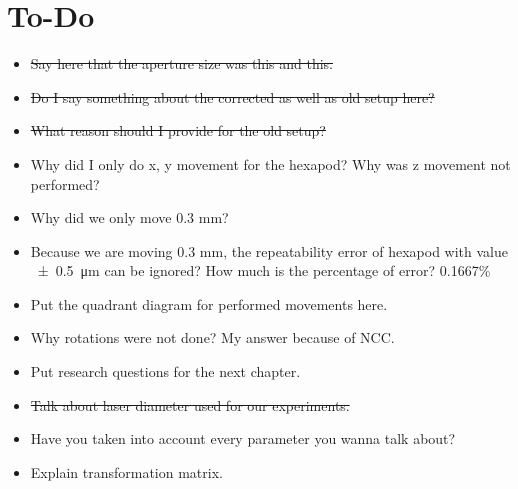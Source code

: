 \section*{To-Do}
\begin{itemize}
    \item \sout{Say here that the aperture size was this and this.}
    \item \sout{Do I say something about the corrected as well as old setup here?}
    \item \sout{What reason should I provide for the old setup?}
    \item Why did I only do x, y movement for the hexapod? Why was z movement not performed?
    \item Why did we only move 0.3 mm?
    \item Because we are moving 0.3 mm, the repeatability error of hexapod with value \SI{\pm0.5}{\micro\meter} can be ignored? How much is the percentage of error? 0.1667\%
    \item Put the quadrant diagram for performed movements here.
    \item Why rotations were not done? My answer because of NCC.
    \item Put research questions for the next chapter.
    \item \sout{Talk about laser diameter used for our experiments.}
    \item Have you taken into account every parameter you wanna talk about?
    \item Explain transformation matrix. 
\end{itemize}